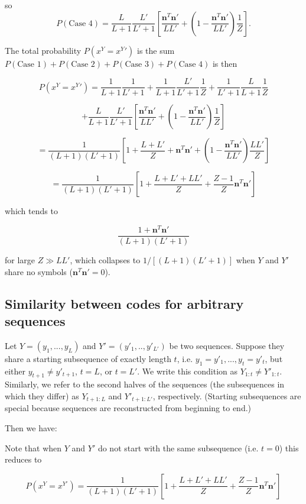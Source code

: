 \documentclass{article}
\begin{document}
so 
$$P(\textrm{Case 4}) = \frac{L}{L+1}\frac{L'}{L'+1}\left[\frac{\mathbf{n}^T\mathbf{n}'}{LL'} + \left(1 - \frac{\mathbf{n}^T\mathbf{n}'}{LL'}\right)\frac{1}{Z}\right].$$

The total probability $P(x^Y = x^Y')$ is the sum $P(\textrm{Case 1}) + P(\textrm{Case 2}) + P(\textrm{Case 3}) + P(\textrm{Case 4})$ is then

$$P(x^Y = x^Y') = \frac{1}{L+1}\frac{1}{L'+1} + \frac{1}{L+1}\frac{L'}{L'+1}\frac{1}{Z} + \frac{1}{L'+1}\frac{L}{L+1}\frac{1}{Z}$$

$$ + \frac{L}{L+1}\frac{L'}{L'+1}\left[\frac{\mathbf{n}^T\mathbf{n}'}{LL'} + \left(1 - \frac{\mathbf{n}^T\mathbf{n}'}{LL'}\right)\frac{1}{Z}\right]$$

$$= \frac{1}{(L+1)(L'+1)}\left[1 + \frac{L + L'}{Z} + \mathbf{n}^T\mathbf{n}' + \left(1 - \frac{\mathbf{n}^T\mathbf{n}'}{LL'}\right)\frac{LL'}{Z}\right]$$

$$= \frac{1}{(L+1)(L'+1)}\left[1 + \frac{L + L' + LL'}{Z} + \frac{Z-1}{Z}\mathbf{n}^T\mathbf{n}'\right]$$

which tends to 

$$\frac{1 + \mathbf{n}^T\mathbf{n}'}{(L+1)(L'+1)}$$

for large $Z \gg LL'$, which collapses to $1/[(L+1)(L'+1)]$ when $Y$ and $Y'$ share no symbols ($\mathbf{n}^T\mathbf{n}' = 0$).

\subsection{Similarity between codes for arbitrary sequences}

Let $Y = (y_1, ..., y_L)$ and $Y' = (y'_1, .., y'_{L'})$ be two sequences. Suppose they share a starting subsequence of exactly length $t$, i.e. $y_1 = y'_1, ..., y_t = y'_t$, but either $y_{t+1} \neq y'_{t+1}$, $t = L$, or $t = L'$. We write this condition as $Y_{1:t} \neq Y'_{1:t}$. Similarly, we refer to the second halves of the sequences (the subsequences in which they differ) as $Y_{t+1:L}$ and $Y'_{t+1:L'}$, respectively. (Starting subsequences are special because sequences are reconstructed from beginning to end.)

Then we have:

Note that when $Y$ and $Y'$ do not start with the same subsequence (i.e. $t = 0$) this reduces to

$$P(x^Y = x^{Y'}) = \frac{1}{(L+1)(L'+1)}\left[1 + \frac{L + L' + LL'}{Z} + \frac{Z-1}{Z}\mathbf{n}^T\mathbf{n}'\right]$$
\end{document}
